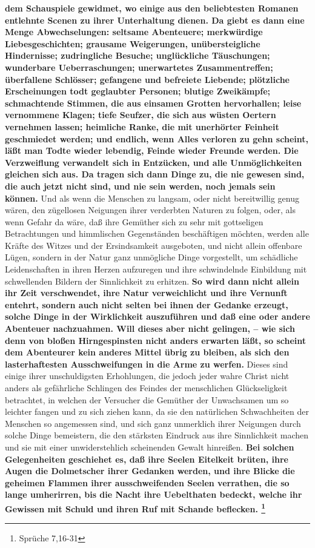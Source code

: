 \textbf{dem Schauspiele
gewidmet, wo einige aus den beliebtesten Romanen entlehnte Scenen zu ihrer
Unterhaltung dienen. Da giebt es dann eine Menge Abwechselungen: seltsame
Abenteuere; merkwürdige Liebesgeschichten; grausame Weigerungen,
unübersteigliche Hindernisse; zudringliche Besuche; unglückliche Täuschungen;
wunderbare Ueberraschungen; unerwartetes Zusammentreffen; überfallene Schlösser;
gefangene und befreiete Liebende; plötzliche Erscheinungen todt geglaubter
Personen; blutige Zweikämpfe; schmachtende Stimmen, die aus einsamen Grotten
hervorhallen; leise vernommene Klagen; tiefe Seufzer, die sich aus wüsten
Oertern vernehmen lassen; heimliche Ranke, die mit unerhörter Feinheit
geschmiedet werden; und endlich, wenn Alles verloren zu gehn scheint, läßt man
Todte wieder lebendig, Feinde wieder Freunde werden. Die Verzweiflung verwandelt
sich in Entzücken, und alle Unmöglichkeiten gleichen sich aus. Da tragen sich
dann Dinge zu, die nie gewesen sind, die auch jetzt nicht sind, und nie sein
werden, noch jemals sein können.} Und als wenn die Menschen zu langsam, oder
nicht bereitwillig genug wären, den zügellosen Neigungen ihrer verderbten
Naturen zu folgen, oder, als wenn Gefahr da wäre, daß ihre Gemüther sich zu sehr
mit gottseligen Betrachtungen und himmlischen Gegenständen beschäftigen möchten,
werden alle Kräfte des Witzes und der Ersindsamkeit ausgeboten, und nicht allein
offenbare Lügen, sondern in der Natur ganz unmögliche Dinge vorgestellt, um
schädliche Leidenschaften in ihren Herzen aufzuregen und ihre schwindelnde
Einbildung mit schwellenden Bildern der Sinnlichkeit zu erhitzen.
\label{ref:17_01_schauspiel_2}
\textbf{So wird dann
nicht allein ihr Zeit verschwendet, ihre Natur verweichlicht und ihre Vernunft
entehrt, sondern auch nicht selten bei ihnen der Gedanke erzeugt, solche Dinge
in der Wirklichkeit auszuführen und daß eine oder andere Abenteuer nachzuahmen.
Will dieses aber nicht gelingen, -- wie sich denn von bloßen Hirngespinsten
nicht anders erwarten läßt, so scheint dem Abenteurer kein anderes Mittel übrig
zu bleiben, als sich den lasterhaftesten Ausschweifungen in die Arme zu werfen.}
Dieses sind einige ihrer unschuldigsten Erhohlungen, die jedoch jeder wahre
Christ nicht anders als gefährliche Schlingen des Feindes der menschlichen
Glückseligkeit betrachtet, in welchen der Versucher die Gemüther der Unwachsamen
um so leichter fangen und zu sich ziehen kann, da sie den natürlichen
Schwachheiten der Menschen so angemessen sind, und sich ganz unmerklich ihrer
Neigungen durch solche Dinge bemeistern, die den stärksten Eindruck aus ihre
Sinnlichkeit machen und sie mit einer unwiderstehlich scheinenden Gewalt
hinreißen. \textbf{Bei solchen Gelegenheiten geschiehet es, daß ihre Seelen
Eitelkeit
brüten, ihre Augen die Dolmetscher ihrer Gedanken werden, und ihre Blicke die
geheimen Flammen ihrer ausschweifenden Seelen verrathen, die so lange
umherirren, bis die Nacht ihre Uebelthaten bedeckt, welche ihr Gewissen mit
Schuld und ihren Ruf mit Schande beflecken.
\footnote{Sprüche 7,16-31}}

